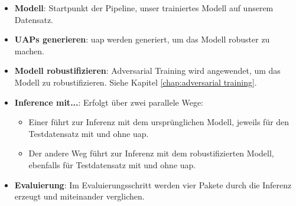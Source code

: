 \begin{itemize}
    \item \textbf{Modell}: Startpunkt der Pipeline, unser trainiertes Modell auf unserem Datensatz.
    \item \textbf{UAPs generieren}: \acrshort{uap} werden generiert, um das Modell robuster zu machen.
    \item \textbf{Modell robustifizieren}: Adversarial Training wird angewendet, um das Modell zu robustifizieren. Siehe Kapitel \ref{chap:adversarial training}.
    \item \textbf{Inference mit...}: Erfolgt über zwei parallele Wege:
        \begin{itemize}
            \item Einer führt zur Inferenz mit dem ursprünglichen Modell, jeweils für den Testdatensatz mit und ohne \acrshort{uap}.
            \item Der andere Weg führt zur Inferenz mit dem robustifizierten Modell, ebenfalls für Testdatensatz mit und ohne \acrshort{uap}.
        \end{itemize}
    \item \textbf{Evaluierung}: Im Evaluierungsschritt werden vier Pakete durch die Inferenz erzeugt und miteinander verglichen.
\end{itemize}

